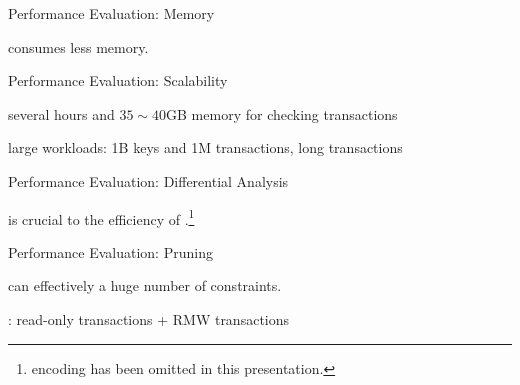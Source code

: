 \begin{frame}{Performance Evaluation: Memory}
	\centerline{\polysi{} consumes less memory.}
\end{frame}

\begin{frame}{Performance Evaluation: Scalability}
	\begin{center}
		several hours and $35 \sim 40$GB memory for checking  transactions

		\vspace{0.30cm}
		\vspace{0.30cm}

		large workloads: 1B keys and 1M transactions, long transactions
	\end{center}
\end{frame}

\begin{frame}{Performance Evaluation: Differential Analysis}
	\begin{center}
		 is crucial to the efficiency of \polysi.\footnote{
			 encoding has been omitted in this presentation.
		}

		\vspace{0.30cm}
	\end{center}
\end{frame}

\begin{frame}{Performance Evaluation: Pruning}
	\begin{center}
		\polysi{} can effectively  a huge number of constraints.

		\vspace{0.30cm}
		
		\vspace{0.30cm}

		: read-only transactions + RMW transactions
	\end{center}
\end{frame}

